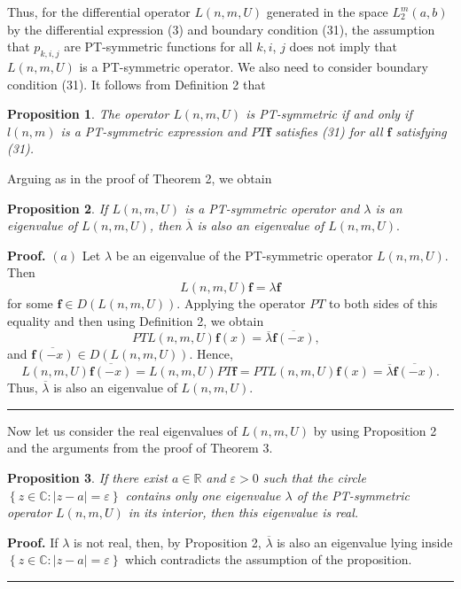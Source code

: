 \documentclass{article}%
\newtheorem{proposition}{Proposition}
\newenvironment{proof}[1][Proof]{\textbf{#1.} }{\ \rule{0.5em}{0.5em}}
\begin{document}
Thus, for the differential operator $L(n,m,U)$ generated in the space
$L_{2}^{m}(a,b)$ by the differential expression (3) and boundary condition
(31), the assumption that $p_{k,i,j}$ are PT-symmetric functions for all
$k,i$, $j$ does not imply that $L(n,m,U)$ is a PT-symmetric operator. We also
need to consider boundary condition (31). It follows from Definition 2 that

\begin{proposition}
The operator $L(n,m,U)$ is PT-symmetric if and only if $l(n,m)$ is a
PT-symmetric expression and $PT\mathbf{f}$ satisfies (31) for all $\mathbf{f}$
satisfying (31).
\end{proposition}

Arguing as in the proof of Theorem 2, we obtain

\begin{proposition}
If $L(n,m,U)$ is a PT-symmetric operator and $\lambda$ is an eigenvalue of
$L(n,m,U)$, then $\overline{\lambda}$ is also an eigenvalue of $L(n,m,U).$
\end{proposition}

\begin{proof}
$(a)$ Let $\lambda$ be an eigenvalue of the PT-symmetric operator $L(n,m,U).$
Then
\[
L(n,m,U)\mathbf{f}=\lambda\mathbf{f}%
\]
for some $\mathbf{f}\in D(L(n,m,U))$. Applying the operator $PT$ to both sides
of this equality and then using Definition 2, we obtain
\[
PTL(n,m,U)\mathbf{f}(x)=\overline{\lambda}\overline{\mathbf{f}(-x)},\text{ }%
\]
and $\overline{\mathbf{f}(-x)}\in D(L(n,m,U)).$ Hence,
\[
L(n,m,U)\overline{\mathbf{f}(-x)}=L(n,m,U)PT\mathbf{f}=PTL(n,m,U)\mathbf{f}%
(x)=\overline{\lambda}\overline{\mathbf{f}(-x)}.
\]
Thus, $\overline{\lambda}$ is also an eigenvalue of $L(n,m,U).$
\end{proof}

Now let us consider the real eigenvalues of $L(n,m,U)$ by using Proposition 2
and the arguments from the proof of Theorem 3.

\begin{proposition}
If there exist $a\in\mathbb{R}$ and $\varepsilon>0$ such that the circle
$\left\{  z\in\mathbb{C}:\left\vert z-a\right\vert =\varepsilon\right\}  $
contains only one eigenvalue $\lambda$ of the PT-symmetric operator $L(n,m,U)$
in its interior, then this eigenvalue is real.
\end{proposition}

\begin{proof}
If $\lambda$ is not real, then, by Proposition 2, $\overline{\lambda}$ is also
an eigenvalue lying inside $\left\{  z\in\mathbb{C}:\left\vert z-a\right\vert
=\varepsilon\right\}  $ which contradicts the assumption of the proposition.
\end{proof}
\end{document}
